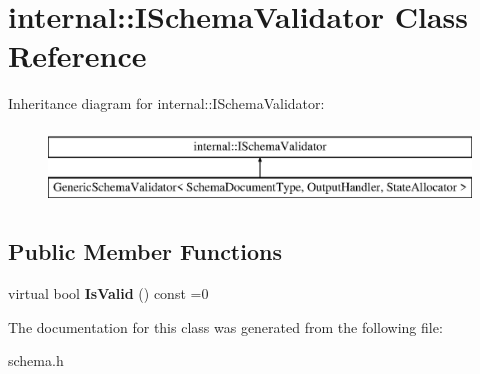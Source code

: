\hypertarget{a02360}{}\section{internal\+:\+:I\+Schema\+Validator Class Reference}
\label{a02360}
Inheritance diagram for internal\+:\+:I\+Schema\+Validator\+:\begin{figure}[H]
\begin{center}
\leavevmode
\includegraphics[height=2.000000cm]{a02360}
\end{center}
\end{figure}
\subsection*{Public Member Functions}
\begin{DoxyCompactItemize}
\item 
\mbox{\label{a02360_a94f61f24b1447497279ef12ee0127285}} 
virtual bool {\bfseries Is\+Valid} () const =0
\end{DoxyCompactItemize}


The documentation for this class was generated from the following file\+:\begin{DoxyCompactItemize}
\item 
schema.\+h\end{DoxyCompactItemize}
